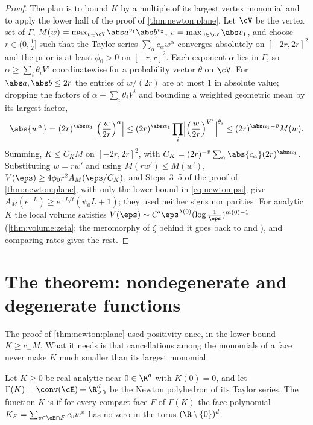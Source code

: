 \begin{refsection}
\begin{proof}
The plan is to bound $K$ by a multiple of its largest vertex monomial and to apply the lower half of the proof of \cref{thm:newton:plane}. Let $\cV$ be the vertex set of $\Gamma$, $M(w)=\max_{v\in\cV}\abs a^{v_1}\abs b^{v_2}$, $\bar v=\max_{v\in\cV}\abs v_1$, and choose $r\in(0,\frac12]$ such that the Taylor series $\sum_\alpha c_\alpha w^\alpha$ converges absolutely on $[-2r,2r]^2$ and the prior is at least $\phi_0>0$ on $[-r,r]^2$. Each exponent $\alpha$ lies in $\Gamma$, so $\alpha\ge\sum_i\theta_iV^i$ coordinatewise for a probability vector $\theta$ on $\cV$. For $\abs a,\abs b\le2r$ the entries of $w/(2r)$ are at most $1$ in absolute value; dropping the factors of $\alpha-\sum_i\theta_iV^i$ and bounding a weighted geometric mean by its largest factor,
\[
\abs{w^\alpha}=(2r)^{\abs\alpha_1}\Bigl|\Bigl(\frac w{2r}\Bigr)^\alpha\Bigr|\le(2r)^{\abs\alpha_1}\prod_i\Bigl|\Bigl(\frac w{2r}\Bigr)^{V^i}\Bigr|^{\theta_i}\le(2r)^{\abs\alpha_1-\bar v}M(w).
\]
Summing, $K\le C_KM$ on $[-2r,2r]^2$, with $C_K=(2r)^{-\bar v}\sum_\alpha\abs{c_\alpha}(2r)^{\abs\alpha_1}$. Substituting $w=rw'$ and using $M(rw')\le M(w')$, $V(\eps)\ge4\phi_0r^2A_M(\eps/C_K)$, and Steps~3--5 of the proof of \cref{thm:newton:plane}, with only the lower bound in \eqref{eq:newton:psi}, give $A_M(e^{-L})\ge e^{-L/t}(\psi_0L+1)$; they used neither signs nor parities. For analytic $K$ the local volume satisfies $V(\eps)\sim C'\eps^{\lambda(0)}(\log\frac1\eps)^{m(0)-1}$ (\cref{thm:volume:zeta}; the meromorphy of $\zeta$ behind it goes back to \textcite{Atiyah1970} and \textcite{BernsteinGelfand1969}), and comparing rates gives the rest.
\end{proof}

\section{The theorem: nondegenerate and degenerate functions}\label{sec:newton:general}

The proof of \cref{thm:newton:plane} used positivity once, in the lower bound $K\ge c_-M$. What it needs is that cancellations among the monomials of a face never make $K$ much smaller than its largest monomial.

\begin{definition}\label{def:newton:nondegenerate}
Let $K\ge0$ be real analytic near $0\in\R^d$ with $K(0)=0$, and let $\Gamma(K)=\conv(\cE)+\R^d_{\ge0}$ be the Newton polyhedron of its Taylor series. The function $K$ is  if for every compact face $F$ of $\Gamma(K)$ the face polynomial $K_F=\sum_{v\in\cE\cap F}c_vw^v$ has no zero in the torus $(\R\setminus\{0\})^d$.
\end{definition}


\end{refsection}

